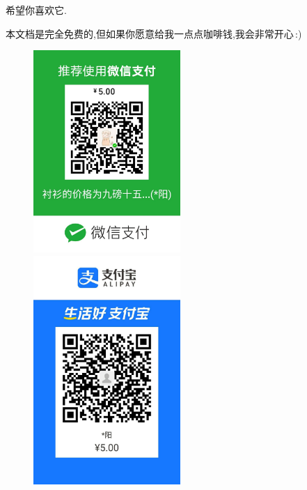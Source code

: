 \documentclass{ctexart}
\numberwithin{equation}{subsection}
\begin{document}
\begin{center}
\Large        希望你喜欢它.
\end{center}
\begin{center}
       本文档是完全免费的,但如果你愿意给我一点点咖啡钱,我会非常开心\,:)
\end{center}
\begin{figure}
      \begin{minipage}[t]{0.5\linewidth}
       \centering
       \includegraphics[width=2.2in]{fig/1.jpg}
      \end{minipage}%
       \begin{minipage}[t]{0.5\linewidth}
       \centering
       \includegraphics[width=2.2in]{fig/2.jpg}
      \end{minipage}
       \end{figure}
\end{document}

